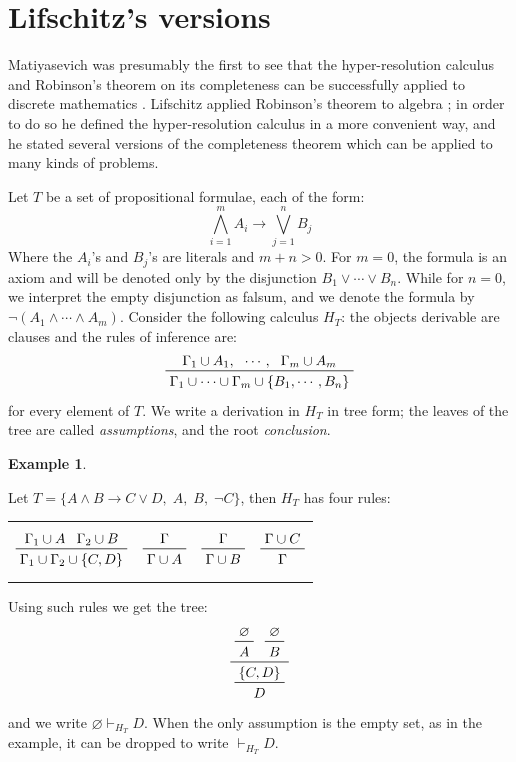 \documentclass[a4paper,12pt,oneside]{book}
\newtheorem{example}[theorem]{Example}
\let\emptyset\varnothing
\let\o\vee
\let\e\wedge
\begin{document}
\newpage
\section{Lifschitz's versions}
Matiyasevich was presumably the first to see that the hyper-resolution calculus and Robinson's theorem on its completeness can be successfully applied to discrete mathematics \cite{mat-1,mat-2}. Lifschitz applied Robinson's theorem to algebra \cite{lifschitz}; in order to do so  he defined the hyper-resolution calculus in a more convenient way, and he stated several versions of the completeness theorem which can be applied to many kinds of problems.

Let $T$ be a set of propositional formulae, each of the form:
\begin{equation}\label{prototipo}
\bigwedge_{i=1}^m A_i \rightarrow \bigvee_{j=1}^n B_j 
\end{equation}
Where the $A_i$'s and $B_j$'s are literals and $m+n>0$. For $m=0$, the formula is an axiom and will be denoted only by the disjunction $B_1\o\cdots\o B_n$. While for $n=0$, we interpret the empty disjunction as falsum, and we denote the formula by $\neg (A_1\e\cdots\e A_m)$.
Consider the following calculus $H_T$: the objects derivable are clauses and the rules of inference are:
\begin{equation}\label{axiom}
\prftree{\Gamma_1 \cup A_1 ,} {\cdots,} {\Gamma_m \cup A_m } 
{\Gamma_1\cup\cdots\cup\Gamma_m\cup\{ B_1 ,\cdots ,B_n\}}
\end{equation}
for every element of $T$. We write a derivation in $H_T$ in tree form; the leaves of the tree are called \textit{assumptions}, and the root \textit{conclusion}.


\newpage
\noindent\begin{example}
\end{example} Let $T=\{ A \e B \rightarrow C \o D ,\; A,\; B,\; \neg C \}$, then $H_T$ has four rules:

\begin{center}
\begin{tabular}{cccc}
$$\prftree{\Gamma_1 \cup A } {\Gamma_2\cup B} {\Gamma_1\cup\Gamma_2\cup \{C,D\}} 
$$
& \hspace{5mm}
$$\prftree{\Gamma }  {\Gamma\cup A} 
$$
& \hspace{5mm}
$$\prftree{\Gamma }  {\Gamma\cup B} 
$$
& \hspace{5mm}
$$\prftree{\Gamma \cup C }  {\Gamma }
$$
\end{tabular}
\end{center}
Using such rules we get the tree:
$$
\prftree{\prftree{\emptyset}{A}}{\prftree{\emptyset}{B}}
{\prftree{\{C , D\}}{D}}
$$
and we write $\emptyset \vdash_{H_T} D$.  When the only assumption is the empty set, as in the example, it can be dropped to write $\vdash_{H_T} D$.
\end{document}
